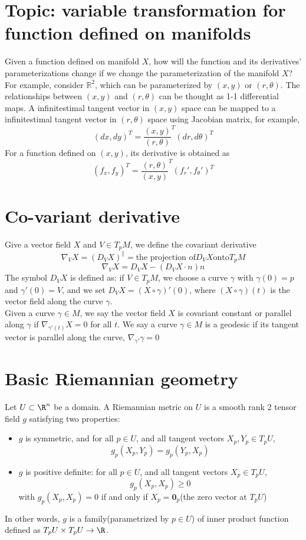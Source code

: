 \begin{refsection}
\section{Topic: variable transformation for function defined on manifolds}
Given a function defined on manifold $X$, how will the function and its derivatives' parameterizations change if we change the parameterization of the manifold $X$?
For example, consider $\mathbb{R}^2$, which can be parameterized by $(x,y)$ or $(r,\theta)$. The relationships between $(x,y)$ and $(r,\theta)$ can be thought as 1-1 differential maps. A infinitestimal tangent vector in $(x,y)$ space can be mapped to a infinitestimal tangent vector in $(r,\theta)$ space using Jacobian matrix, for example\cite{chirikjian2011stochastic}, $$(dx,dy)^T = \frac{(x,y)}{(r,\theta)}^T (dr,d\theta)^T$$ For a function defined on $(x,y)$, its derivative is obtained as $$(f_x,f_y)^T = \frac{(r,\theta)}{(x,y)}^T (f_r',f_{\theta}')^T$$ 



\section{Co-variant derivative }\cite{Shifrin2015}
Give a vector field $X$ and $V \in T_pM$, we define the covariant derivative
$$\nabla_V X = (D_V X)^{\parallel} = \text{the projection of} D_V X \text{onto} T_pM$$
$$\nabla_V X = D_V X - (D_V X \cdot n)n$$
The symbol $D_V X$ is defined as: if $V \in T_pM$, we choose a curve $\gamma$ with $\gamma(0) = p$ and $\gamma'(0) = V$, and we set $D_VX = (X\circ \gamma)'(0)$, where $(X\circ \gamma)(t)$ is the vector field along the curve $\gamma$.\\
Given a curve $\gamma \in M$, we say the vector field $X$ is covariant constant or parallel along $\gamma$ if $\nabla_{\gamma'(t)}X = 0$ for all $t$.
We say a curve $\gamma \in M$ is a geodesic if its tangent vector is parallel along the curve, $\nabla_{\gamma'}\gamma = 0$ 



\section{Basic Riemannian geometry}

\begin{definition}\cite[196]{mcinerney2013first}
Let $U\subset \R^n$ be a domain. A Riemannian metric on $U$ is a smooth rank 2 tensor field $g$ satisfying two properties:
\begin{itemize}
    \item $g$ is symmetric, and for all $p\in U$, and all tangent vectors $X_p,Y_p \in T_pU$, $$g_p(X_p,Y_p) = g_p(Y_p,X_p)$$
    \item $g$ is positive definite: for all $p\in U$, and all tangent vectors $X_p \in T_p U$, 
    $$g_p(X_p,X_p) \geq 0$$
    with $g_p(X_p,X_p) = 0$ if and only if $X_p = \bm{0}_p$(the zero vector at $T_pU$) 
\end{itemize}
In other words, $g$ is a family(parametrized by $p\in U$) of inner product function defined as $T_pU \times T_pU \to \R$.
\end{definition}


\end{refsection}
